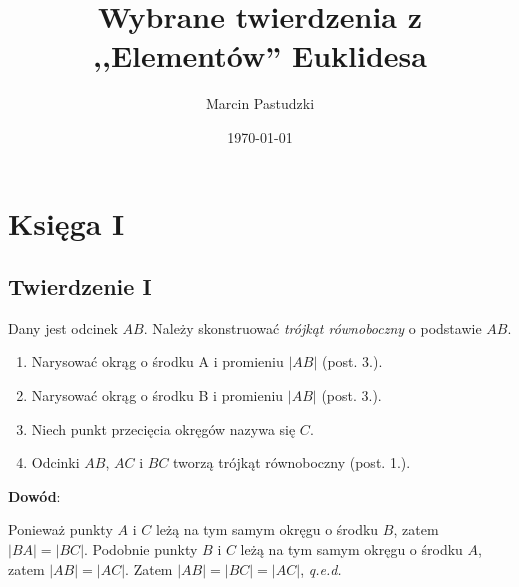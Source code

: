 \documentclass[12pt, a4paper]{article}
\title{Wybrane twierdzenia z ,,Elementów'' Euklidesa}
\author{Marcin Pastudzki}
\date{\today}
\begin{document}
\section*{Księga I}
\subsection*{Twierdzenie I}

Dany jest odcinek $AB$. Należy skonstruować \emph{trójkąt równoboczny} o
podstawie $AB$.

\begin{figure}[h!]
    \begin{center}
    \end{center}
\end{figure}

\begin{enumerate}
    \item Narysować okrąg o środku A i promieniu $|AB|$ (post. 3.).
    \item Narysować okrąg o środku B i promieniu $|AB|$ (post. 3.).
    \item Niech punkt przecięcia okręgów nazywa się $C$.
    \item Odcinki $AB$, $AC$ i $BC$ tworzą trójkąt równoboczny (post. 1.).
\end{enumerate}

\textbf{Dowód}:

Ponieważ punkty $A$ i $C$ leżą na tym samym okręgu o środku $B$, zatem $|BA| = |BC|$.
Podobnie punkty $B$ i $C$ leżą na tym samym okręgu o środku $A$, zatem $|AB| = |AC|$.
Zatem $|AB| = |BC| = |AC|$, \emph{q.e.d.}
\end{document}
